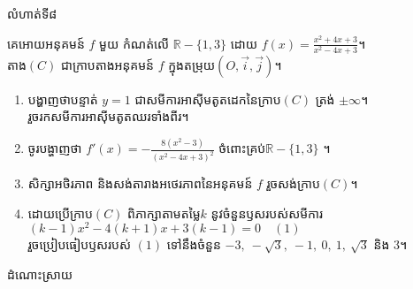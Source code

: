 \documentclass[expologarit]{subfiles}
\begin{document}
 \begin{center}
\color{violet} \kml លំហាត់ទី៨
 \end{center}
 គេអោយអនុគមន៍ $f$ មួយ កំណត់លើ $\mathbb{R}-\{1,3\}$ ដោយ $f(x)=\frac{x^2+4x+3}{x^2-4x+3}$។ \\
 តាង$(C)$ ជាក្រាបតាងអនុគមន៍ $f$ ក្នុងតម្រុយ$\left(O,\overrightarrow{i},\overrightarrow{j}\right)$។
 \begin{enumerate}[k]
 \item បង្ហាញថាបន្ទាត់ $y=1$ ជាសមីការអាស៊ីមតូតដេកនៃក្រាប$(C)$ ត្រង់ $\pm\infty$។\\ រួចរកសមីការអាស៊ីមតូតឈរទាំងពីរ។
 \item ចូរបង្ហាញថា $f'(x)=-\frac{8\left(x^2-3\right)}{\left(x^2-4x+3\right)^2}$ ចំពោះគ្រប់$\mathbb{R}-\{1,3\}$ ។
 \item សិក្សាអថិរភាព និងសង់តារាងអថេរភាពនៃអនុគមន៍ $f$ រួចសង់ក្រាប$(C)$។
 \item ដោយប្រើក្រាប$(C)$ ពិភាក្សាតាមតម្លៃ$k$ នូវចំនួនឫសរបស់សមីការ \\
 $(k-1)x^2-4(k+1)x+3(k-1)=0\quad (1)$\\
 រួចប្រៀបធៀបឫសរបស់ $(1)$ ទៅនឹងចំនួន $-3,\ -\sqrt{3},\ -1,\ 0,\ 1,\ \sqrt{3}$ និង $3$។
 \end{enumerate}
 \begin{center}
\color{violet} \kml ដំណោះស្រាយ
 \end{center}
\end{document}
